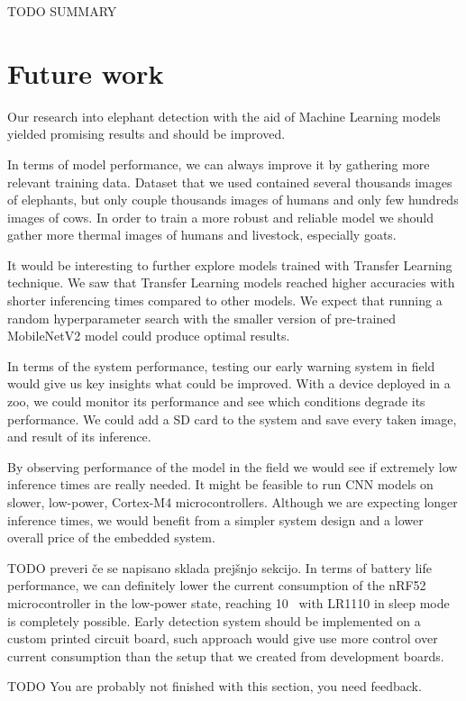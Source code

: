 TODO SUMMARY



\section{Future work}

Our research into elephant detection with the aid of Machine Learning models yielded promising results and should be improved.

In terms of model performance, we can always improve it by gathering more relevant training data.
Dataset that we used contained several thousands images of elephants, but only couple thousands images of humans and only few hundreds images of cows.
In order to train a more robust and reliable model we should gather more thermal images of humans and livestock, especially goats.

It would be interesting to further explore models trained with Transfer Learning technique.
We saw that Transfer Learning models reached higher accuracies with shorter inferencing times compared to other models.
We expect that running a random hyperparameter search with the smaller version of pre-trained MobileNetV2 model could produce optimal results.

In terms of the system performance, testing our early warning system in field would give us key insights what could be improved.
With a device deployed in a zoo, we could monitor its performance and see which conditions degrade its performance.
We could add a SD card to the system and save every taken image, and result of its inference.

By observing performance of the model in the field we would see if extremely low inference times are really needed.
It might be feasible to run CNN models on slower, low-power, Cortex-M4 microcontrollers.
Although we are expecting longer inference times, we would benefit from a simpler system design and a lower overall price of the embedded system.

TODO preveri če se napisano sklada prejšnjo sekcijo.
In terms of battery life performance, we can definitely lower the current consumption of the nRF52 microcontroller in the low-power state, reaching 10\si{\micro\apmere} with LR1110 in sleep mode is completely possible.
Early detection system should be implemented on a custom printed circuit board, such approach would give use more control over current consumption than the setup that we created from development boards.

TODO You are probably not finished with this section, you need feedback.


